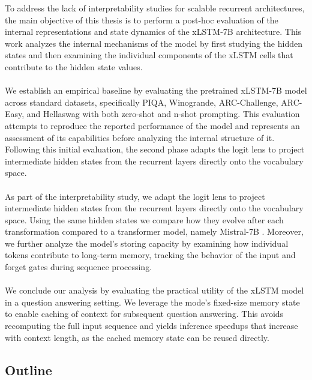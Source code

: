 To address the lack of interpretability studies for scalable recurrent architectures, the main objective of this thesis is 
to perform a post-hoc evaluation of the internal representations and state dynamics of the xLSTM-7B architecture. 
This work analyzes the internal mechanisms of the model by first studying the hidden states and then examining the individual components
of the xLSTM cells that contribute to the hidden state values.\\ \\ 
%
We establish an empirical baseline by evaluating the pretrained xLSTM-7B model across standard 
datasets, specifically PIQA\cite{bisk2020piqa}, Winogrande\cite{sakaguchi2021winogrande}, ARC-Challenge\cite{clark2018arc}, ARC-Easy\cite{clark2018arc}, 
and Hellaswag\cite{zellers2019hellaswag} with both zero-shot and n-shot prompting. This evaluation  attempts to reproduce the reported performance of the model
and represents an assessment of its capabilities before 
analyzing the internal structure of it. Following this initial evaluation, the second phase adapts the logit lens\cite{nostalgebraist2020logitlens}
\cite{belrose2023tunedlens} to project intermediate hidden states from the recurrent layers directly onto the vocabulary space. \\ \\
%
As part of the interpretability study, we adapt the logit lens\cite{nostalgebraist2020logitlens}
\cite{belrose2023tunedlens} to project intermediate hidden states from the recurrent layers directly onto the vocabulary space.
Using the same hidden states we compare how they evolve after each transformation compared to a transformer model, namely Mistral-7B \cite{jiang2023mistral7b}.
Moreover, we further analyze the model's storing capacity
by examining how individual tokens contribute to long-term memory, 
tracking the behavior of the input and forget gates during sequence processing. \\ \\
%
We conclude our analysis by evaluating the practical utility of the xLSTM model in a 
question answering setting. We leverage the mode's fixed-size memory state to enable 
caching of context for subsequent question answering. This avoids recomputing the full 
input sequence and yields inference speedups that increase with context length, as the 
cached memory state can be reused directly.
\subsection{Outline}

